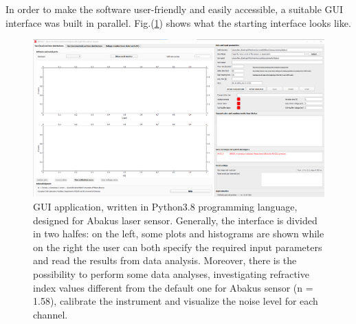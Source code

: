 \documentclass[a4paper, 11pt]{report}
\begin{document}
In order to make the software user-friendly and easily accessible, a suitable GUI interface was built in parallel. 
Fig.(\ref{abakus_software}) shows what the starting interface looks like.
\begin{figure}[!hp]
	\centering
	\includegraphics[scale=0.32]{abakus_software.png}
	\caption{GUI application, written in Python3.8 programming language, designed for Abakus laser sensor. Generally, the interface is divided in two halfes: on the left, some plots and histograms are shown while on the right the user can both specify the required input parameters and read the results from data analysis. Moreover, there is the possibility to perform some data analyses, investigating refractive index values different from the default one for Abakus sensor (n = 1.58), calibrate the instrument and visualize the noise level for each channel.}
	\label{abakus_software}
\end{figure}




\newpage
\end{document}
